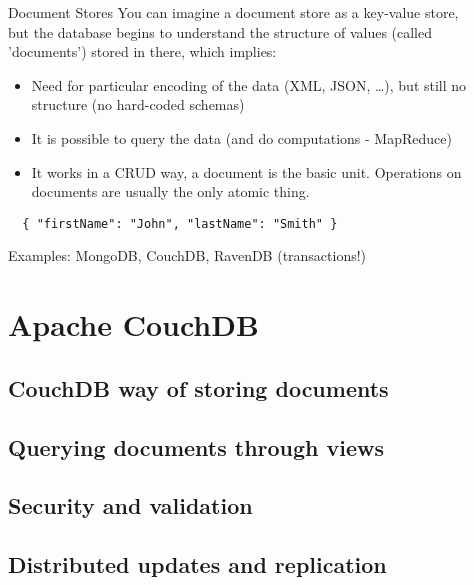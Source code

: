 \documentclass{beamer}
\begin{document}
\begin{frame}[fragile]{Document Stores}
  You can imagine a document store as a key-value store,\\but the database begins
  to understand the structure of values (called 'documents') stored in there,
  which implies:
  \begin{itemize}
    \item Need for particular encoding of the data (XML, JSON, \ldots),
          but still no structure (no hard-coded schemas)
    \item It is possible to query the data (and do computations - MapReduce)
    \item It works in a CRUD way, a document is the basic unit.
          Operations on documents are usually the only atomic thing.
  \end{itemize}
  \begin{verbatim}
  { "firstName": "John", "lastName": "Smith" }
  \end{verbatim}
  Examples: MongoDB, \alert<2>{CouchDB}, RavenDB (transactions!)
\end{frame}

\section{Apache CouchDB}
\subsection{CouchDB way of storing documents}
\begin{frame}
\end{frame}

\subsection{Querying documents through views}
\begin{frame}
\end{frame}

\subsection{Security and validation}
\begin{frame}
\end{frame}

\subsection{Distributed updates and replication}
\begin{frame}
\end{frame}
\end{document}

